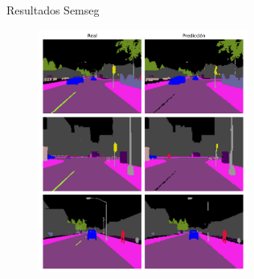 \documentclass[10pt, usepdftitle=false]{beamer}
\begin{document}

\begin{frame}[fragile]{Resultados Semseg}
	\begin{figure}[H]
		\captionsetup{labelformat=empty}
		\centering
		\includegraphics[height=8cm]{imagenes/preds/semseg}
	\end{figure}
\end{frame}
\end{document}
